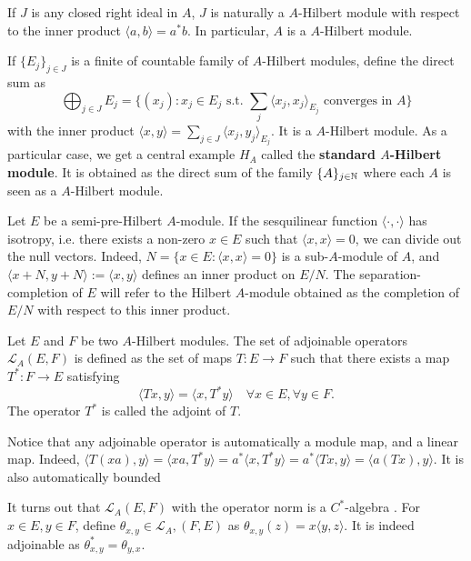 \begin{Expl} If $J$ is any closed right ideal in $A$, $J$ is naturally a $A$-Hilbert module with respect to the inner product $\langle a, b \rangle = a^* b$. In particular, $A$ is a $A$-Hilbert module.
\end{Expl}

\begin{Expl}
If $\{E_j\}_{j\in J}$ is a finite of countable family of $A$-Hilbert modules, define the direct sum as
\[\bigoplus_{j\in J} E_j = \{(x_j) : x_j\in E_j \text{ s.t. } \sum_j \langle x_j,x_j\rangle_{E_j} \text{ converges in } A\}\]
with the inner product $\langle x,y \rangle = \sum_{j\in J} \langle x_j, y_j\rangle_{E_j} $. It is a $A$-Hilbert module. As a particular case, we get a central example $H_A$ called the \textbf{standard $A$-Hilbert module}. It is obtained as the direct sum of the family $\{A\}_{j\in \mathbb N}$ where each $A$ is seen as a $A$-Hilbert module.
\end{Expl}

Let $E$ be a semi-pre-Hilbert $A$-module. If the sesquilinear function $\langle \cdot ,\cdot \rangle$ has isotropy, i.e. there exists a non-zero $x\in E$ such that $\langle x,x\rangle =0$, we can divide out the null vectors. Indeed, $N= \{x\in E : \langle x,x\rangle = 0\}$ is a sub-$A$-module of $A$, and $\langle x+ N,y+N\rangle := \langle x,y\rangle $ defines an inner product on $E/N$. The separation-completion of $E$ will refer to the Hilbert $A$-module obtained as the completion of $E/N$ with respect to this inner product. 

\begin{definition}
Let $E$ and $F$ be two $A$-Hilbert modules. The set of adjoinable operators $\mathcal L_A(E,F)$ is defined as the set of maps $T : E\rightarrow F $ such that there exists a map $T^* : F\rightarrow E$ satisfying 
\[\langle Tx, y \rangle = \langle x ,T^* y\rangle\quad \forall x\in E,\forall y\in F.\]
The operator $T^*$ is called the adjoint of $T$.
\end{definition}

\begin{rk}
Notice that any adjoinable operator is automatically a module map, and a linear map. Indeed, $\langle T(xa),y\rangle = \langle xa,T^* y \rangle = a^* \langle x, T^* y\rangle =a^*\langle Tx,  y\rangle =  \langle a(Tx),y \rangle$. It is also automatically bounded
\end{rk}

It turns out that $\mathcal L_A(E,F)$ with the operator norm is a $C^*$-algebra \cite{Lance}. For $x\in E,y\in F$, define $\theta_{x,y}\in\mathcal L_A,(F,E)$ as $\theta_{x,y}(z) = x\langle y,z\rangle$. It is indeed adjoinable as $\theta_{x,y}^*=\theta_{y,x}$.

